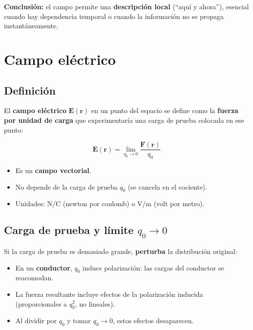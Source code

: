 \documentclass[12pt,a4paper]{article}
\begin{document}
\textbf{Conclusión:} el campo permite una \textbf{descripción local}
(``aquí y ahora''), esencial cuando hay dependencia temporal o cuando
la información no se propaga instantáneamente.

\section{Campo eléctrico}

\subsection{Definición}

El \textbf{campo eléctrico} $\mathbf{E}(\mathbf{r})$ en un punto del
espacio se define como la \textbf{fuerza por unidad de carga} que
experimentaría una carga de prueba colocada en ese punto:

\begin{keybox}
  \[
  \boxed{\mathbf{E}(\mathbf{r}) =
         \lim_{q_0 \to 0} \frac{\mathbf{F}(\mathbf{r})}{q_0}}
  \]
\end{keybox}

\begin{itemize}[nosep]
  \item Es un \textbf{campo vectorial}.
  \item No depende de la carga de prueba $q_0$ (se cancela en el
        cociente).
  \item Unidades: N/C (newton por coulomb) o V/m (volt por metro).
\end{itemize}

\subsection{Carga de prueba y límite $q_0 \to 0$}

Si la carga de prueba es demasiado grande, \textbf{perturba} la
distribución original:
\begin{itemize}[nosep]
  \item En un \textbf{conductor}, $q_0$ induce polarización: las cargas
        del conductor se reacomodan.
  \item La fuerza resultante incluye efectos de la polarización
        inducida (proporcionales a $q_0^{2}$, no lineales).
  \item Al dividir por $q_0$ y tomar $q_0 \to 0$, estos efectos
        desaparecen.
\end{itemize}
\end{document}
